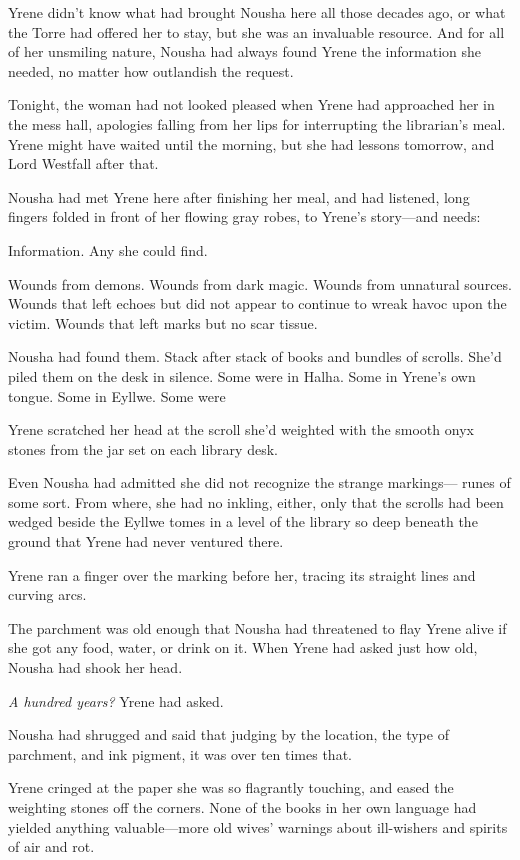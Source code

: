 Yrene didn't know what had brought Nousha here all those decades ago, or what the Torre had offered her to stay, but she was an invaluable resource. And for all of her unsmiling nature, Nousha had always found Yrene the information she needed, no matter how outlandish the request.

Tonight, the woman had not looked pleased when Yrene had approached her in the mess hall, apologies falling from her lips for interrupting the librarian's meal. Yrene might have waited until the morning, but she had lessons tomorrow, and Lord Westfall after that.

Nousha had met Yrene here after finishing her meal, and had listened, long fingers folded in front of her flowing gray robes, to Yrene's story---and needs:

Information. Any she could find.

Wounds from demons. Wounds from dark magic. Wounds from unnatural sources. Wounds that left echoes but did not appear to continue to wreak havoc upon the victim. Wounds that left marks but no scar tissue.

Nousha had found them. Stack after stack of books and bundles of scrolls. She'd piled them on the desk in silence. Some were in Halha. Some in Yrene's own tongue. Some in Eyllwe. Some were 

Yrene scratched her head at the scroll she'd weighted with the smooth onyx stones from the jar set on each library desk.

Even Nousha had admitted she did not recognize the strange markings--- runes of some sort. From where, she had no inkling, either, only that the scrolls had been wedged beside the Eyllwe tomes in a level of the library so deep beneath the ground that Yrene had never ventured there.

Yrene ran a finger over the marking before her, tracing its straight lines and curving arcs.

The parchment was old enough that Nousha had threatened to flay Yrene alive if she got any food, water, or drink on it. When Yrene had asked just how old, Nousha had shook her head.

\emph{A hundred years?} Yrene had asked.

Nousha had shrugged and said that judging by the location, the type of parchment, and ink pigment, it was over ten times that.

Yrene cringed at the paper she was so flagrantly touching, and eased the weighting stones off the corners. None of the books in her own language had yielded anything valuable---more old wives' warnings about ill-wishers and spirits of air and rot.

